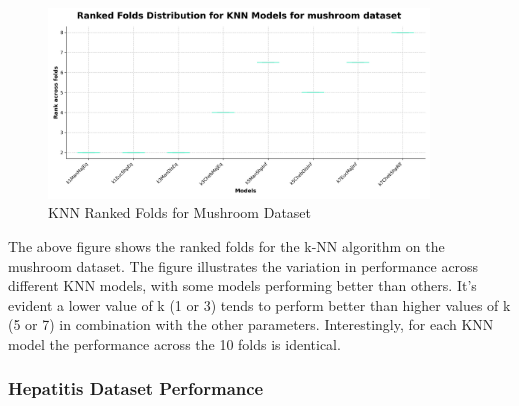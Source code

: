 \begin{figure}
    \centering
    \includegraphics[width=0.9\textwidth]{figures/ranked_folds_KNN_mushroom.png}
    \caption{KNN Ranked Folds for Mushroom Dataset}
    \label{fig:ranked_folds_KNN_mushroom}
\end{figure}

The above figure shows the ranked folds for the k-NN algorithm on the mushroom dataset.
The figure illustrates the variation in performance across different KNN models, with some models performing 
better than others. It's evident a lower value of k (1 or 3) tends to perform better than higher values of k (5 or 7)
in combination with the other parameters. 
Interestingly, for each KNN model the performance across the 10 folds is identical.

\subsubsection{Hepatitis Dataset Performance}

